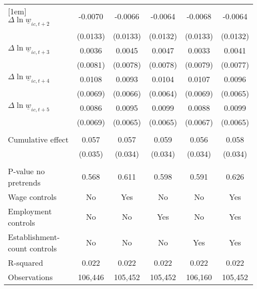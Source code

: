 {\begin{tabular}{l*{5}{c}}
[1em]
$\Delta \ln \underline{w}_{ic,t+2}$&  -0.0070         &  -0.0066         &  -0.0064         &  -0.0068         &  -0.0064         \\
          & (0.0133)         & (0.0133)         & (0.0132)         & (0.0133)         & (0.0132)         \\
[1em]
$\Delta \ln \underline{w}_{ic,t+3}$&   0.0036         &   0.0045         &   0.0047         &   0.0033         &   0.0041         \\
          & (0.0081)         & (0.0078)         & (0.0078)         & (0.0079)         & (0.0077)         \\
[1em]
$\Delta \ln \underline{w}_{ic,t+4}$&   0.0108         &   0.0093         &   0.0104         &   0.0107         &   0.0096         \\
          & (0.0069)         & (0.0066)         & (0.0064)         & (0.0069)         & (0.0065)         \\
[1em]
$\Delta \ln \underline{w}_{ic,t+5}$&   0.0086         &   0.0095         &   0.0099         &   0.0088         &   0.0099         \\
          & (0.0069)         & (0.0065)         & (0.0065)         & (0.0067)         & (0.0065)         \\
\hline
\vspace{-2mm}&                  &                  &                  &                  &                  \\
Cumulative effect&    0.057         &0.057\sym{*}         &0.059\sym{*}         &    0.056         &0.058\sym{*}         \\
          &  (0.035)         &  (0.034)         &  (0.034)         &  (0.034)         &  (0.034)         \\
\hline    &                  &                  &                  &                  &                  \\
P-value no pretrends&    0.568         &    0.611         &    0.598         &    0.591         &    0.626         \\
Wage controls&       No         &      Yes         &       No         &       No         &      Yes         \\
Employment controls&       No         &       No         &      Yes         &       No         &      Yes         \\
Establishment-count controls&       No         &       No         &       No         &      Yes         &      Yes         \\
R-squared &    0.022         &    0.022         &    0.022         &    0.022         &    0.022         \\
Observations&  106,446         &  105,452         &  105,452         &  106,160         &  105,452         \\
\hline\hline
\end{tabular}
}
